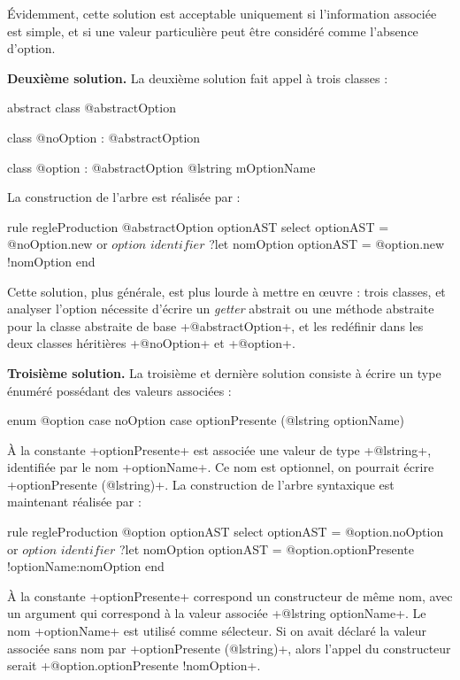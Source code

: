 Évidemment, cette solution est acceptable uniquement si l'information associée est simple, et si une valeur particulière peut être considéré comme l'absence d'option.

\textbf{Deuxième solution.} La deuxième solution fait appel à trois classes :
\begin{galgascode}
abstract class @abstractOption {}

class @noOption : @abstractOption {}

class @option : @abstractOption { @lstring mOptionName }
\end{galgascode}

La construction de l'arbre est réalisée par :
\begin{galgascode}
rule regleProduction {
  @abstractOption optionAST
  select
    optionAST = @noOption.new
  or
    $option$
    $identifier$ ?let nomOption
    optionAST = @option.new {!nomOption}
  end
}
\end{galgascode}

Cette solution, plus générale, est plus lourde à mettre en œuvre : trois classes, et analyser l'option nécessite d'écrire un \emph{getter} abstrait ou une méthode abstraite pour la classe abstraite de base \ggs+@abstractOption+, et les redéfinir dans les deux classes héritières \ggs+@noOption+ et \ggs+@option+.

\textbf{Troisième solution.} La troisième et dernière solution consiste à écrire un type énuméré possédant des valeurs associées :

\begin{galgascode}
enum @option {
  case noOption
  case optionPresente (@lstring optionName)
}
\end{galgascode}

À la constante \ggs+optionPresente+ est associée une valeur de type \ggs+@lstring+, identifiée par le nom \ggs+optionName+. Ce nom est optionnel, on pourrait écrire \ggs+optionPresente (@lstring)+. La construction de l'arbre syntaxique est maintenant réalisée par :
\begin{galgascode}
rule regleProduction {
  @option optionAST
  select
    optionAST = @option.noOption
  or
    $option$
    $identifier$ ?let nomOption
    optionAST = @option.optionPresente {!optionName:nomOption}
  end
}
\end{galgascode}

À la constante \ggs+optionPresente+ correspond un constructeur de même nom, avec un argument qui correspond à la valeur associée \ggs+@lstring optionName+. Le nom \ggs+optionName+ est utilisé comme sélecteur. Si on avait déclaré la valeur associée sans nom par \ggs+optionPresente (@lstring)+, alors l'appel du constructeur serait \ggs+@option.optionPresente {!nomOption}+.

